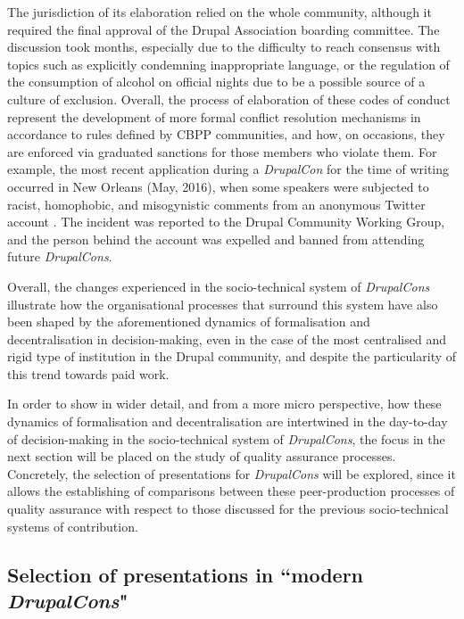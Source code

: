 The jurisdiction of its elaboration relied on the whole community, although it required the final approval of the Drupal Association boarding committee. The discussion took months, especially due to the difficulty to reach consensus with topics such as explicitly condemning inappropriate language, or the regulation of the consumption of alcohol on official nights due to be a possible source of a culture of exclusion. Overall, the process of elaboration of these codes of conduct represent the development of more formal conflict resolution mechanisms in accordance to rules defined by CBPP communities, and how, on occasions, they are enforced via graduated sanctions for those members who violate them. For example, the most recent application during a \textit{DrupalCon} for the time of writing occurred in New Orleans (May, 2016), when some speakers were subjected to racist, homophobic, and misogynistic comments from an anonymous Twitter account \parencite{drupal-cwc-application:2016:Online}. The incident was reported to the Drupal Community Working Group, and the person behind the account was expelled and banned from attending future \textit{DrupalCons}.

Overall, the changes experienced in the socio-technical system of \textit{DrupalCons} illustrate how the organisational processes that surround this system have also been shaped by the aforementioned dynamics of formalisation and decentralisation in decision-making, even in the case of the most centralised and rigid type of institution in the Drupal community, and despite the particularity of this trend towards paid work.

In order to show in wider detail, and from a more micro perspective, how these dynamics of formalisation and decentralisation are intertwined in the day-to-day of decision-making in the socio-technical system of \textit{DrupalCons}, the focus in the next section will be placed on the study of quality assurance processes. Concretely, the selection of presentations for \textit{DrupalCons} will be explored, since it allows the establishing of comparisons between these peer-production processes of quality assurance with respect to those discussed for the previous socio-technical systems of contribution.

\subsection{Selection of presentations in ``modern \textit{DrupalCons}"}
\label{subsec:dcons-day-to-day}

